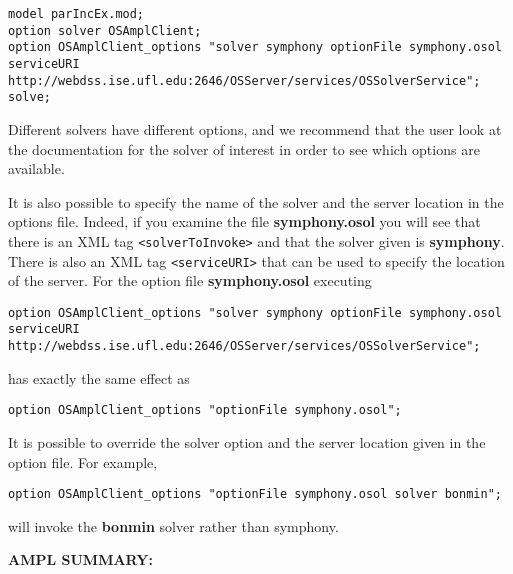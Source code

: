 \documentclass[11pt]{article}
\renewcommand{\{}{{\char"7B}}
\renewcommand{\}}{{\char"7D}}
\renewcommand{\^}{{\char"0D}}
\renewcommand{\'}{{\char"0D}}
\begin{document}
{\tiny
\begin{verbatim}
model parIncEx.mod;
option solver OSAmplClient;
option OSAmplClient_options "solver symphony optionFile symphony.osol  serviceURI http://webdss.ise.ufl.edu:2646/OSServer/services/OSSolverService";
solve;
\end{verbatim}
}





Different solvers have different options, and we recommend that the user look at the documentation for the solver of interest in order to see which options are available. 


It is also possible to specify the name of the solver and the server location in the options file. Indeed, if you examine the file {\bf symphony.osol} you will see that there is an XML tag {\tt <solverToInvoke>} and that the solver given is {\bf symphony}. There is also an XML tag {\tt <serviceURI>} that can be used to specify the location of the server.  For the option file {\bf symphony.osol} executing 


{\tiny
\begin{verbatim}
option OSAmplClient_options "solver symphony optionFile symphony.osol  serviceURI http://webdss.ise.ufl.edu:2646/OSServer/services/OSSolverService";
\end{verbatim}
}
\noindent has exactly the same effect as

\begin{verbatim}
option OSAmplClient_options "optionFile symphony.osol";
\end{verbatim}
It is possible to override the solver option and the server location given in the option file. For example, 
\begin{verbatim}
option OSAmplClient_options "optionFile symphony.osol solver bonmin";
\end{verbatim}
will invoke the {\bf bonmin} solver rather than symphony. 







\vskip 12pt

{\bf AMPL SUMMARY:}
\end{document}
